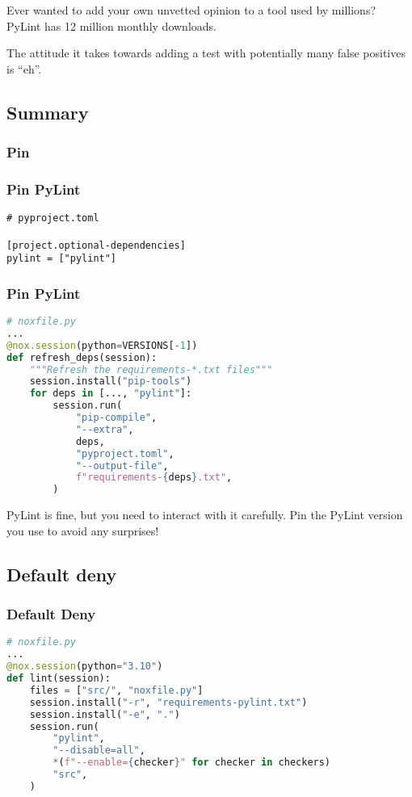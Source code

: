 Ever wanted to add your own unvetted opinion to a tool used by millions?
PyLint has 12 million monthly downloads.

The attitude it takes towards adding a test with potentially many false
positives is ``eh''.

\hypertarget{summary}{%
\subsection{Summary}\label{summary}}

\hypertarget{pin}{%
\subsubsection{Pin}\label{pin}}

\begin{frame}[fragile]
\frametitle{Pin PyLint}

\begin{lstlisting}
# pyproject.toml

[project.optional-dependencies]
pylint = ["pylint"]
\end{lstlisting}

\end{frame}

\begin{frame}[fragile]
\frametitle{Pin PyLint}

\begin{lstlisting}[language=Python]
# noxfile.py
...
@nox.session(python=VERSIONS[-1])
def refresh_deps(session):
    """Refresh the requirements-*.txt files"""
    session.install("pip-tools")
    for deps in [..., "pylint"]:
        session.run(
            "pip-compile",
            "--extra",
            deps,
            "pyproject.toml",
            "--output-file",
            f"requirements-{deps}.txt",
        )
\end{lstlisting}

\end{frame}

PyLint is fine, but you need to interact with it carefully. Pin the
PyLint version you use to avoid any surprises!

\hypertarget{default-deny}{%
\subsection{Default deny}\label{default-deny}}

\begin{frame}[fragile]
\frametitle{Default Deny}

\begin{lstlisting}[language=Python]
# noxfile.py
...
@nox.session(python="3.10")
def lint(session):
    files = ["src/", "noxfile.py"]
    session.install("-r", "requirements-pylint.txt")
    session.install("-e", ".")
    session.run(
        "pylint",
        "--disable=all",
        *(f"--enable={checker}" for checker in checkers)
        "src",
    )
\end{lstlisting}

\end{frame}

